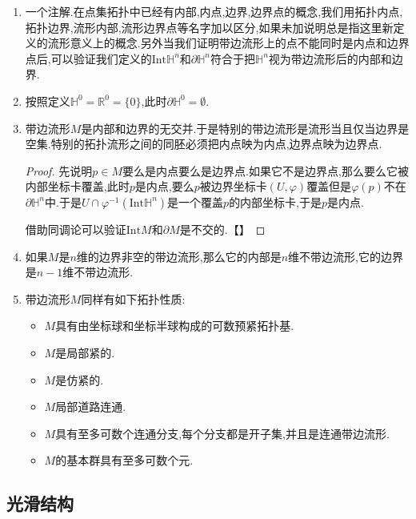 \begin{enumerate}
	\item 一个注解.在点集拓扑中已经有内部,内点,边界,边界点的概念,我们用拓扑内点,拓扑边界,流形内部,流形边界点等名字加以区分,如果未加说明总是指这里新定义的流形意义上的概念.另外当我们证明带边流形上的点不能同时是内点和边界点后,可以验证我们定义的$\mathrm{Int}\mathbb{H}^n$和$\partial\mathbb{H}^n$符合于把$\mathbb{H}^n$视为带边流形后的内部和边界.
	\item 按照定义$\mathbb{H}^0=\mathbb{R}^0=\{0\}$,此时$\partial\mathbb{H}^0=\emptyset$.
	\item 带边流形$M$是内部和边界的无交并.于是特别的带边流形是流形当且仅当边界是空集.特别的拓扑流形之间的同胚必须把内点映为内点,边界点映为边界点.
	\begin{proof}
		
		先说明$p\in M$要么是内点要么是边界点.如果它不是边界点,那么要么它被内部坐标卡覆盖,此时$p$是内点,要么$p$被边界坐标卡$(U,\varphi)$覆盖但是$\varphi(p)$不在$\partial\mathbb{H}^n$中.于是$U\cap\varphi^{-1}(\mathrm{Int}\mathbb{H}^n)$是一个覆盖$p$的内部坐标卡,于是$p$是内点.
		
		借助同调论可以验证$\mathrm{Int}M$和$\partial M$是不交的.【】
	\end{proof}
	\item 如果$M$是$n$维的边界非空的带边流形,那么它的内部是$n$维不带边流形,它的边界是$n-1$维不带边流形.
	\item 带边流形$M$同样有如下拓扑性质:
	\begin{itemize}
		\item $M$具有由坐标球和坐标半球构成的可数预紧拓扑基.
		\item $M$是局部紧的.
		\item $M$是仿紧的.
		\item $M$局部道路连通.
		\item $M$具有至多可数个连通分支,每个分支都是开子集,并且是连通带边流形.
		\item $M$的基本群具有至多可数个元.
	\end{itemize}
\end{enumerate}

\subsection{光滑结构}

